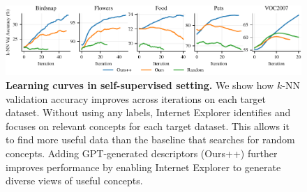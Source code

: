 \begin{figure}[t]
    \centering
    \includegraphics[width=\linewidth]{figures/ssl-curves-updated.pdf}
    \vspace{-2.4em}
    \caption{\textbf{Learning curves in self-supervised setting.} We show how $k$-NN validation accuracy improves across iterations on each target dataset. Without using any labels, Internet Explorer identifies and focuses on relevant concepts for each target dataset. This allows it to find more useful data than the baseline that searches for random concepts. Adding GPT-generated descriptors (Ours++) further improves performance by enabling Internet Explorer to generate diverse views of useful concepts. 
    } 
    \label{fig:learning_curves}
\end{figure}

